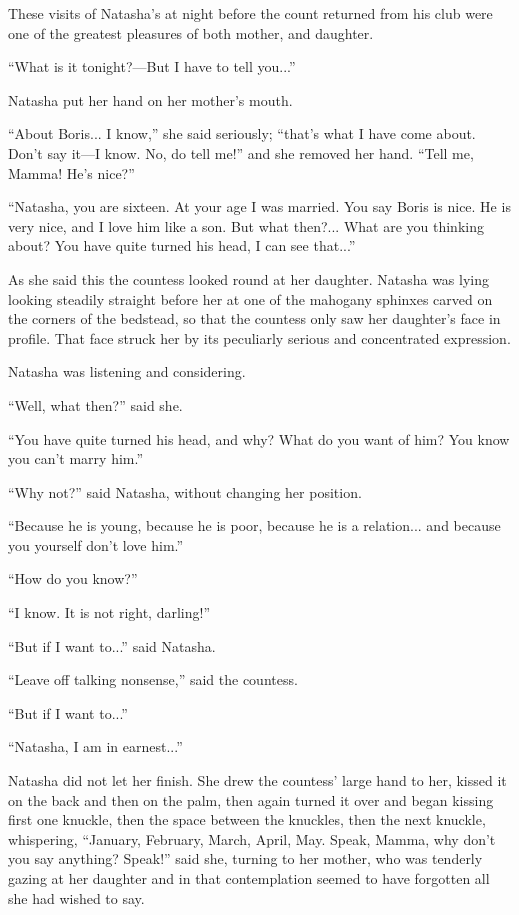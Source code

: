 These visits of Natasha's at night before the count returned from
his club were one of the greatest pleasures of both mother, and
daughter.

``What is it tonight?---But I have to tell you...''

Natasha put her hand on her mother's mouth.

``About Boris... I know,'' she said seriously; ``that's what I
have come about. Don't say it---I know. No, do tell me!'' and she
removed her hand.  ``Tell me, Mamma! He's nice?''

``Natasha, you are sixteen. At your age I was married. You say
Boris is nice. He is very nice, and I love him like a son. But
what then?... What are you thinking about? You have quite turned
his head, I can see that...''

As she said this the countess looked round at her
daughter. Natasha was lying looking steadily straight before her
at one of the mahogany sphinxes carved on the corners of the
bedstead, so that the countess only saw her daughter's face in
profile. That face struck her by its peculiarly serious and
concentrated expression.

Natasha was listening and considering.

``Well, what then?'' said she.

``You have quite turned his head, and why? What do you want of
him? You know you can't marry him.''

``Why not?'' said Natasha, without changing her position.

``Because he is young, because he is poor, because he is a
relation...  and because you yourself don't love him.''

``How do you know?''

``I know. It is not right, darling!''

``But if I want to...'' said Natasha.

``Leave off talking nonsense,'' said the countess.

``But if I want to...''

``Natasha, I am in earnest...''

Natasha did not let her finish. She drew the countess' large hand
to her, kissed it on the back and then on the palm, then again
turned it over and began kissing first one knuckle, then the
space between the knuckles, then the next knuckle, whispering,
``January, February, March, April, May. Speak, Mamma, why don't
you say anything? Speak!'' said she, turning to her mother, who
was tenderly gazing at her daughter and in that contemplation
seemed to have forgotten all she had wished to say.

